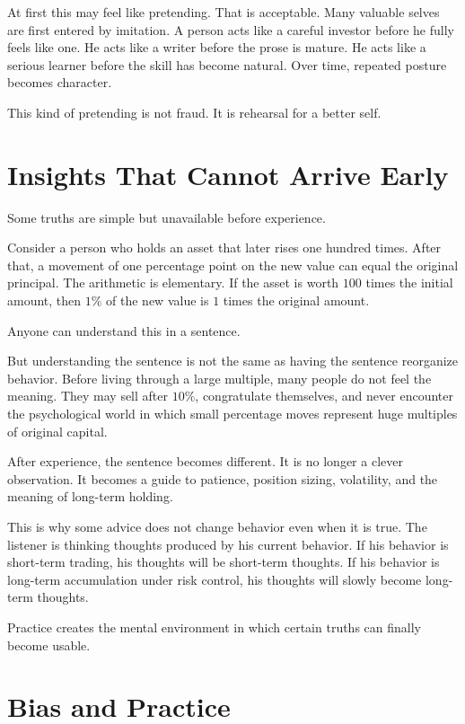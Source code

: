 At first this may feel like pretending. That is acceptable. Many valuable selves are first entered by imitation. A person acts like a careful investor before he fully feels like one. He acts like a writer before the prose is mature. He acts like a serious learner before the skill has become natural. Over time, repeated posture becomes character.

This kind of pretending is not fraud. It is rehearsal for a better self.

\section*{Insights That Cannot Arrive Early}

Some truths are simple but unavailable before experience.

Consider a person who holds an asset that later rises one hundred times. After that, a movement of one percentage point on the new value can equal the original principal. The arithmetic is elementary. If the asset is worth \(100\) times the initial amount, then \(1\%\) of the new value is \(1\) times the original amount.

Anyone can understand this in a sentence.

But understanding the sentence is not the same as having the sentence reorganize behavior. Before living through a large multiple, many people do not feel the meaning. They may sell after \(10\%\), congratulate themselves, and never encounter the psychological world in which small percentage moves represent huge multiples of original capital.

After experience, the sentence becomes different. It is no longer a clever observation. It becomes a guide to patience, position sizing, volatility, and the meaning of long-term holding.

This is why some advice does not change behavior even when it is true. The listener is thinking thoughts produced by his current behavior. If his behavior is short-term trading, his thoughts will be short-term thoughts. If his behavior is long-term accumulation under risk control, his thoughts will slowly become long-term thoughts.

Practice creates the mental environment in which certain truths can finally become usable.

\section*{Bias and Practice}

